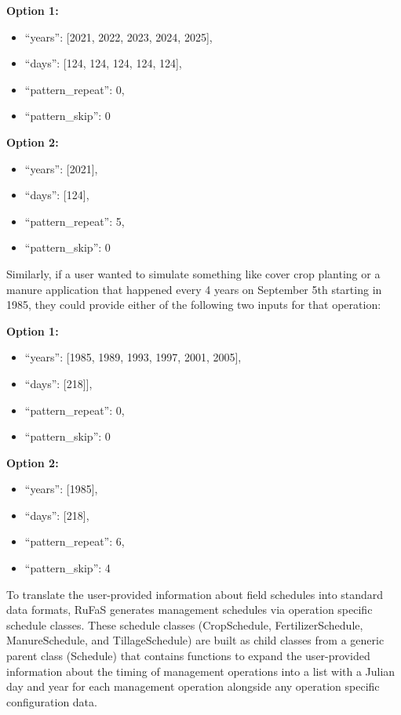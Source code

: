 \textbf{Option 1:}
\begin{itemize}
    \item “years”: [2021, 2022, 2023, 2024, 2025],
    \item “days”: [124, 124, 124, 124, 124],
    \item “pattern\_repeat”: 0, 
    \item “pattern\_skip”: 0
\end{itemize}


\textbf{Option 2:}
\begin{itemize}
    \item “years”: [2021],
    \item “days”: [124],
    \item “pattern\_repeat”: 5, 
    \item “pattern\_skip”: 0
\end{itemize}

Similarly, if a user wanted to simulate something like cover crop planting or a manure application that happened every 4 years on September 5th starting in 1985, they could provide either of the following two inputs for that operation:
\vspace{0.2cm}

\textbf{Option 1:}
\begin{itemize}
    \item “years”: [1985, 1989, 1993, 1997, 2001, 2005],
    \item “days”: [218]],
    \item “pattern\_repeat”: 0, 
    \item “pattern\_skip”: 0
\end{itemize}


\textbf{Option 2:}
\begin{itemize}
    \item “years”: [1985],
    \item “days”: [218],
    \item “pattern\_repeat”: 6, 
    \item “pattern\_skip”: 4
\end{itemize}

To translate the user-provided information about field schedules into standard data formats, RuFaS generates management schedules via operation specific schedule classes. These schedule classes (CropSchedule, FertilizerSchedule, ManureSchedule, and TillageSchedule) are built as child classes from a generic parent class (Schedule) that contains functions to expand the user-provided information about the timing of management operations into a list with a Julian day and year for each management operation alongside any operation specific configuration data. 
\vspace{0.2cm}

